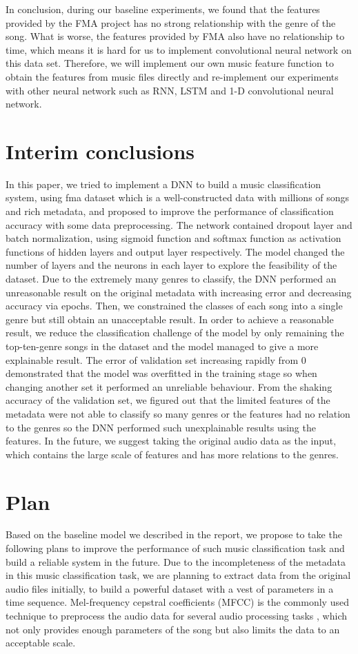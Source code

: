 \documentclass{article}
\begin{document}
In conclusion, during our baseline experiments, we found that the features provided by the FMA project has no strong relationship with the genre of the song. What is worse, the features provided by FMA also have no relationship to time, which means it is hard for us to implement convolutional neural network on this data set. Therefore, we will implement our own music feature function to obtain the features from music files directly and re-implement our experiments with other neural network such as RNN, LSTM and 1-D convolutional neural network.


\section{Interim conclusions}
In this paper, we tried to implement a DNN to build a music classification system, using fma dataset which is a well-constructed data with millions of songs and rich metadata, and proposed to improve the performance of classification accuracy with some data preprocessing. The network contained dropout layer and batch normalization, using sigmoid function and softmax function as activation functions of hidden layers and output layer respectively. The model changed the number of layers and the neurons in each layer to explore the feasibility of the dataset. Due to the extremely many genres to classify, the DNN performed an unreasonable result on the original metadata with increasing error and decreasing accuracy via epochs. Then, we constrained the classes of each song into a single genre but still obtain an unacceptable result. 
In order to achieve a reasonable result, we reduce the classification challenge of the model by only remaining the top-ten-genre songs in the dataset and the model managed to give a more explainable result. The error of validation set increasing rapidly from 0 demonstrated that the model was overfitted in the training stage so when changing another set it performed an unreliable behaviour. From the shaking accuracy of the validation set, we figured out that the limited features of the metadata were not able to classify so many genres or the features had no relation to the genres so the DNN performed such unexplainable results using the features. In the future, we suggest taking the original audio data as the input, which contains the large scale of features and has more relations to the genres.

\section{Plan}
Based on the baseline model we described in the report, we propose to take the following plans to improve the performance of such music classification task and build a reliable system in the future. Due to the incompleteness of the metadata in this music classification task, we are planning to extract data from the original audio files initially, to build a powerful dataset with a vest of parameters in a time sequence. Mel-frequency cepstral coefficients (MFCC) is the commonly used technique to preprocess the audio data for several audio processing tasks \cite{rabiner1993fundamentals}, which not only provides enough parameters of the song but also limits the data to an acceptable scale. 
\end{document}
